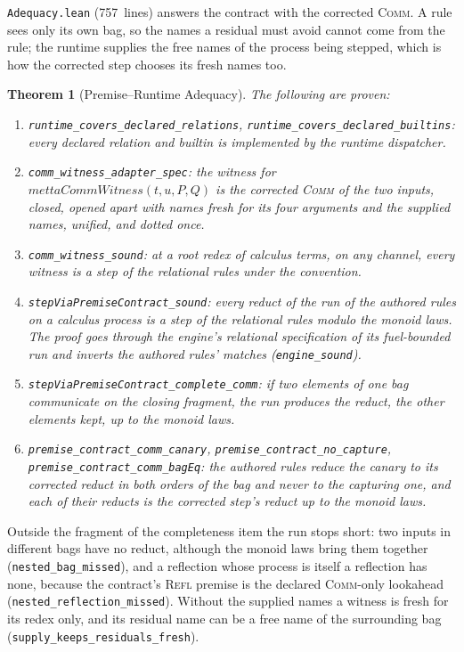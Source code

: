 \documentclass[11pt]{article}
\newtheorem{theorem}{Theorem}[section]
\theoremstyle{definition}
\theoremstyle{remark}
\begin{document}
\texttt{Adequacy.lean} (757~lines) answers the contract with the corrected
\textsc{Comm}.  A rule sees only its own bag, so the names a residual must
avoid cannot come from the rule; the runtime supplies the free names of the
process being stepped, which is how the corrected step chooses its fresh
names too.

\begin{theorem}[Premise--Runtime Adequacy]
\label{thm:metta-adequacy}
The following are proven:
\begin{enumerate}[nosep]
\item \texttt{runtime\_covers\_declared\_relations},
  \texttt{runtime\_covers\_declared\_builtins}: every declared relation and
  builtin is implemented by the runtime dispatcher.
\item \texttt{comm\_witness\_adapter\_spec}: the witness for
  $\mathit{mettaCommWitness}(t, u, P, Q)$ is the corrected \textsc{Comm} of
  the two inputs, closed, opened apart with names fresh for its four
  arguments and the supplied names, unified, and dotted once.
\item \texttt{comm\_witness\_sound}: at a root redex of calculus terms, on
  any channel, every witness is a step of the relational rules under the
  convention.
\item \texttt{stepViaPremiseContract\_sound}: every reduct of the run of the
  authored rules on a calculus process is a step of the relational rules
  modulo the monoid laws.  The proof goes through the engine's relational
  specification of its fuel-bounded run and inverts the authored rules'
  matches (\texttt{engine\_sound}).
\item \texttt{stepViaPremiseContract\_complete\_comm}: if two elements of
  one bag communicate on the closing fragment, the run produces the reduct,
  the other elements kept, up to the monoid laws.
\item \texttt{premise\_contract\_comm\_canary},
  \texttt{premise\_contract\_no\_capture},
  \texttt{premise\_contract\_comm\_bagEq}: the authored rules reduce the
  canary to its corrected reduct in both orders of the bag and never to the
  capturing one, and each of their reducts is the corrected step's reduct
  up to the monoid laws.
\end{enumerate}
\end{theorem}

\noindent
Outside the fragment of the completeness item the run stops short: two
inputs in different bags have no reduct, although the monoid laws bring
them together (\texttt{nested\_bag\_missed}), and a reflection whose process
is itself a reflection has none, because the contract's \textsc{Refl}
premise is the declared \textsc{Comm}-only lookahead
(\texttt{nested\_reflection\_missed}).  Without the supplied names a
witness is fresh for its redex only, and its residual name can be a free
name of the surrounding bag (\texttt{supply\_keeps\_residuals\_fresh}).
\end{document}
